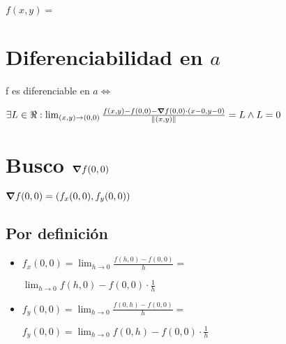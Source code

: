 \documentclass[../parcial.tex]{subfiles}
\begin{document}
    $ f(x,y) = $

    \section*{Diferenciabilidad en $a$}

    f es diferenciable en $a \Leftrightarrow$

    $ \exists L \in \real : \lim_{(x,y)\to (0,0)} \frac{f(x,y) - f(0,0) - \grad f (0,0) \cdot(x-0,y-0)}{\norm*{(x,y)}} = L \wedge L = 0 $

    \section*{Busco $\grad f(0,0)$}

    $ \grad f(0,0) = (f_x(0,0), f_y(0,0)) $

    \subsection*{Por definición}
    
    \begin{itemize}
        \item $ f_x(0,0) = \lim_{h\to0} \frac{f(h,0) - f(0,0)}{h} = $
        
            $ \lim_{h\to0} f(h,0) - f(0,0) \cdot \frac{1}{h} $

        \item $ f_y(0,0) = \lim_{h\to0} \frac{f(0,h) - f(0,0)}{h} = $

            $ f_y(0,0) = \lim_{h\to0} f(0,h) - f(0,0) \cdot \frac{1}{h} $
    \end{itemize}
    
\end{document}
